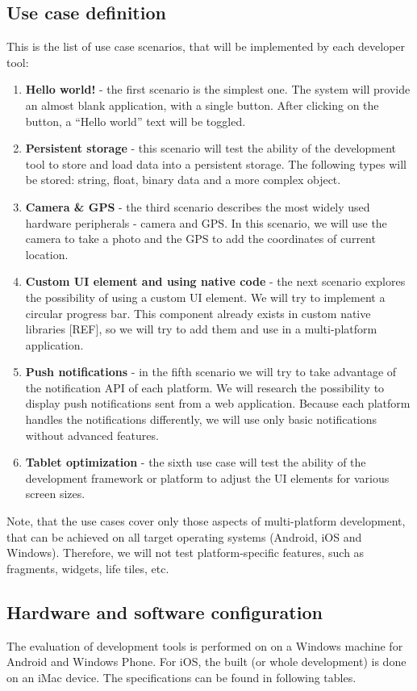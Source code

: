 \documentclass[english,master,public,dept460,male,cpdeclaration,oneside]{diploma}
\begin{document}
\subsection{Use case definition}
This is the list of use case scenarios, that will be implemented by each developer tool:

\begin{enumerate}
	\item \textbf{Hello world! }- the first scenario is the simplest one. The system will provide an almost blank application, with a single button. After clicking on the button, a “Hello world” text will be toggled.
	\item \textbf{Persistent storage }- this scenario will test the ability of the development tool to store and load data into a persistent storage. The following types will be stored: string, float, binary data and a more complex object.
	\item \textbf{Camera \& GPS }- the third scenario describes the most widely used hardware peripherals - camera and GPS. In this scenario, we will use the camera to take a photo and the GPS to add the coordinates of current location.
	\item \textbf{Custom UI element and using native code }- the next scenario explores the possibility of using a custom UI element. We will try to implement a circular progress bar. This component already exists in custom native libraries [REF], so we will try to add them and use in a multi-platform application.
	\item \textbf{Push notifications }- in the fifth scenario we will try to take advantage of the notification API of each platform. We will research the possibility to display push notifications sent from a web application. Because each platform handles the notifications differently, we will use only basic notifications without advanced features.
	\item \textbf{Tablet optimization} - the sixth use case will test the ability of the development framework or platform to adjust the UI elements for various screen sizes.
\end{enumerate}

Note, that the use cases cover only those aspects of multi-platform development, that can be achieved on all target operating systems (Android, iOS and Windows). Therefore, we will not test platform-specific features, such as fragments, widgets, life tiles, etc.

\subsection{Hardware and software configuration}
The evaluation of development tools is performed on on a Windows machine for Android and Windows Phone. For iOS, the built (or whole development) is done on an iMac device. The specifications can be found in following tables.
\end{document}
